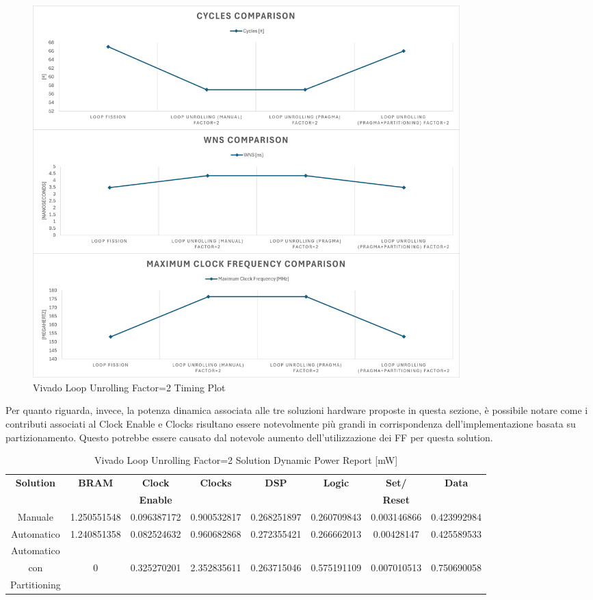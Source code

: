 \begin{figure}[H]
    \centering
    \includegraphics[width=0.8\textwidth]{solutions/loop_unrolling/factor2/loopunrollingfactor2timing.png}
    \caption{Vivado Loop Unrolling Factor=2 Timing Plot}
    \label{fig:vivado-loop-unrolling-factor2-solution-timing-plot}
\end{figure}

Per quanto riguarda, invece, la potenza dinamica associata alle tre soluzioni hardware proposte in questa sezione, è possibile notare come i contributi associati al Clock Enable e Clocks risultano essere notevolmente più grandi in corrispondenza dell'implementazione basata su partizionamento. Questo potrebbe essere causato dal notevole aumento dell'utilizzazione dei FF per questa solution. 

\begin{table}[H]
    \centering
    \begin{tabular}{|c|c|c|c|c|c|c|c|}
        \hline
        \textbf{Solution} & \textbf{BRAM} & \textbf{Clock} & \textbf{Clocks} & \textbf{DSP} & \textbf{Logic} & \textbf{Set/}& \textbf{Data} \\
        & & \textbf{Enable} & & & & \textbf{Reset} & \\
        \hline
        Manuale & 1.250551548 & 0.096387172 & 0.900532817 & 0.268251897 & 0.260709843 & 0.003146866 & 0.423992984 \\
        \hline
        Automatico & 1.240851358 & 0.082524632 & 0.960682868 & 0.272355421 & 0.266662013 & 0.00428147 & 0.425589533 \\
        \hline
        Automatico & & & & & & & \\
        con & 0 & 0.325270201 & 2.352835611 & 0.263715046 & 0.575191109 & 0.007010513 & 0.750690058 \\
        Partitioning & & & & & & & \\
        \hline
    \end{tabular}
    \caption{Vivado Loop Unrolling Factor=2 Solution Dynamic Power Report [mW]}
    \label{tab:vivado-loop-unrolling-factor2-solution-dynamic-power-reproot}
\end{table}


